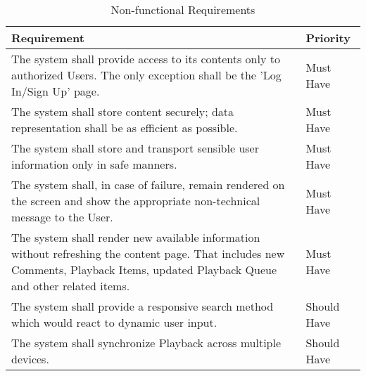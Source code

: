\begin{table}[h!]
    \centering
    \begin{tabular}{|p{12cm}|p{3cm}|}
        \hline
        \textbf{Requirement}                                                                                                                                                               & \textbf{Priority} \\
        \hline
        The system shall provide access to its contents only to authorized Users. The only exception shall be the 'Log In/Sign Up' page. & Must Have \\
        \hline
        The system shall store content securely; data representation shall be as efficient as possible. & Must Have \\
        \hline
        The system shall store and transport sensible user information only in safe manners. & Must Have \\
        \hline
        The system shall, in case of failure, remain rendered on the screen and show the appropriate non-technical message to the User. & Must Have \\
        \hline
        The system shall render new available information without refreshing the content page. That includes new Comments, Playback Items, updated Playback Queue and other related items. & Must Have \\
        \hline
        The system shall provide a responsive search method which would react to dynamic user input. & Should Have       \\
        \hline
        The system shall synchronize Playback across multiple devices.                                                                                                                     & Should Have       \\
        \hline
    \end{tabular}
    \caption{Non-functional Requirements}
\end{table}
